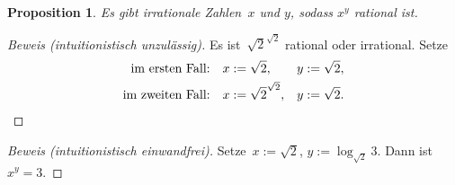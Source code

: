 \documentclass{algblatt}
\theoremstyle{plain}
\newtheorem{prop}{Proposition}
\begin{document}
\enlargethispage{3em}

\begin{prop}
  Es gibt irrationale Zahlen~$x$ und $y$, sodass $x^y$ rational ist.
\end{prop}

\begin{proof}[Beweis (intuitionistisch unzulässig)]
  Es ist~$\sqrt{2}^{\sqrt{2}}$ rational oder irrational. Setze
  \begin{align*}
    \text{im ersten Fall:} && x &:= \sqrt{2}, & y &:= \sqrt{2}, \\
    \text{im zweiten Fall:} &&
    x &:= \sqrt{2}^{\sqrt{2}}, & y & := \sqrt{2}. \qedhere
  \end{align*}
\end{proof}

\begin{proof}[Beweis (intuitionistisch einwandfrei)]
  Setze~$x := \sqrt{2}$, $y := \log_{\sqrt{2}} 3$. Dann ist $x^y = 3$.
\end{proof}
\end{document}
